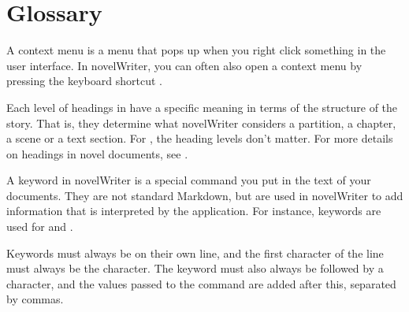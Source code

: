\documentclass[a4paper,11pt,english]{sphinxmanual}
\begin{document}
\chapter{Glossary}
\label{\detokenize{int_glossary:glossary}}\label{\detokenize{int_glossary:a-glossary}}\label{\detokenize{int_glossary::doc}}\begin{description}
\sphinxAtStartPar
A context menu is a menu that pops up when you right click something in the user interface.
In novelWriter, you can often also open a context menu by pressing the keyboard shortcut
.

\sphinxAtStartPar
Each level of headings in {\hyperref[\detokenize{int_glossary:term-Novel-Documents}]{}} have a specific meaning in terms of the
structure of the story. That is, they determine what novelWriter considers a partition, a
chapter, a scene or a text section. For {\hyperref[\detokenize{int_glossary:term-Project-Notes}]{}}, the heading levels don’t
matter. For more details on headings in novel documents, see {\hyperref[\detokenize{project_structure:a-struct-heads}]{}}.

\sphinxAtStartPar
A keyword in novelWriter is a special command you put in the text of your documents. They are
not standard Markdown, but are used in novelWriter to add information that is interpreted by
the application. For instance, keywords are used for {\hyperref[\detokenize{int_glossary:term-Tag}]{}} and
{\hyperref[\detokenize{int_glossary:term-Reference}]{}}.

\sphinxAtStartPar
Keywords must always be on their own line, and the first character of the line must always be
the  character. The keyword must also always be followed by a \sphinxcode{\sphinxupquote{:}} character, and the
values passed to the command are added after this, separated by commas.


\end{description}
\end{document}

